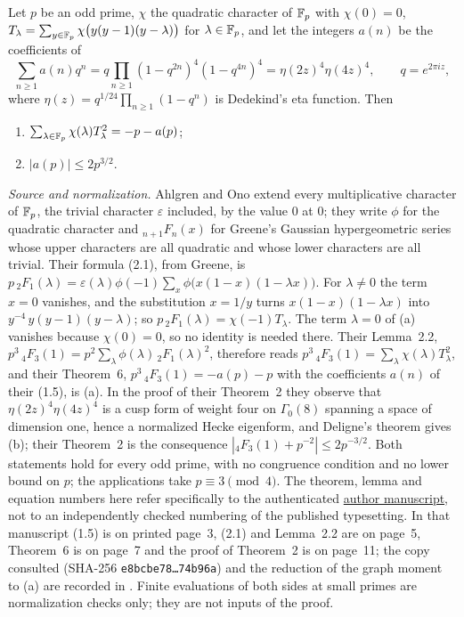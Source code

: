 \begin{theorem}\label{thm:ahlgren-ono}
Let $p$ be an odd prime, $\chi$ the quadratic character of $\mathbb F_p$ with
$\chi(0)=0$, $T_\lambda=\sum_{y\in\mathbb F_p}\chi\big(y(y-1)(y-\lambda)\big)$ for
$\lambda\in\mathbb F_p$, and let the integers $a(n)$ be the coefficients of
\[
 \sum_{n\ge1}a(n)q^n=q\prod_{n\ge1}(1-q^{2n})^4(1-q^{4n})^4=\eta(2z)^4\eta(4z)^4,
 \qquad q=e^{2\pi iz},
\]
where $\eta(z)=q^{1/24}\prod_{n\ge1}(1-q^n)$ is Dedekind's eta function. Then
\begin{enumerate}[label=\textup{(\alph*)}]
\item $\sum_{\lambda\in\mathbb F_p}\chi(\lambda)T_\lambda^2=-p-a(p)$;
\item $|a(p)|\le2p^{3/2}$.
\end{enumerate}
\end{theorem}

\noindent\emph{Source and normalization.} Ahlgren and Ono extend every
multiplicative character of $\mathbb F_p$, the trivial character $\varepsilon$ included,
by the value $0$ at $0$; they write $\phi$ for the quadratic character and
${}_{n+1}F_n(x)$ for Greene's Gaussian hypergeometric series whose upper
characters are all quadratic and whose lower characters are all trivial. Their
formula (2.1), from Greene, is
$p\,{}_2F_1(\lambda)=\varepsilon(\lambda)\phi(-1)\sum_x\phi\big(x(1-x)(1-\lambda x)\big)$.
For $\lambda\ne0$ the term $x=0$ vanishes, and the substitution $x=1/y$ turns
$x(1-x)(1-\lambda x)$ into $y^{-4}\,y(y-1)(y-\lambda)$; so
$p\,{}_2F_1(\lambda)=\chi(-1)T_\lambda$. The term $\lambda=0$ of (a) vanishes
because $\chi(0)=0$, so no identity is needed there. Their Lemma~2.2,
$p^3\,{}_4F_3(1)=p^2\sum_\lambda\phi(\lambda)\,{}_2F_1(\lambda)^2$, therefore reads
$p^3\,{}_4F_3(1)=\sum_\lambda\chi(\lambda)T_\lambda^2$, and their Theorem~6,
$p^3\,{}_4F_3(1)=-a(p)-p$ with the coefficients $a(n)$ of their (1.5), is (a). In
the proof of their Theorem~2 they observe that $\eta(2z)^4\eta(4z)^4$ is a cusp
form of weight four on $\Gamma_0(8)$ spanning a space of dimension one, hence a
normalized Hecke eigenform, and Deligne's theorem \cite{DeligneWeilI} gives (b);
their Theorem~2 is the consequence $|{}_4F_3(1)+p^{-2}|\le2p^{-3/2}$. Both
statements hold for every odd prime, with no congruence condition and no lower
bound on $p$; the applications take $p\equiv3\pmod4$. The theorem, lemma and
equation numbers here refer specifically to the authenticated
\href{https://uva.theopenscholar.com/files/ken-ono/files/049.pdf}{author manuscript},
not to an independently checked numbering of the published typesetting. In that manuscript (1.5) is on
printed page~3, (2.1) and Lemma~2.2 are on page~5, Theorem~6 is on page~7 and
the proof of Theorem~2 is on page~11; the
copy consulted (SHA-256 \texttt{e8bcbe78\ldots74b96a}) and the reduction of the
graph moment to (a) are recorded in
. Finite
evaluations of both sides at small primes are normalization checks only; they
are not inputs of the proof.

